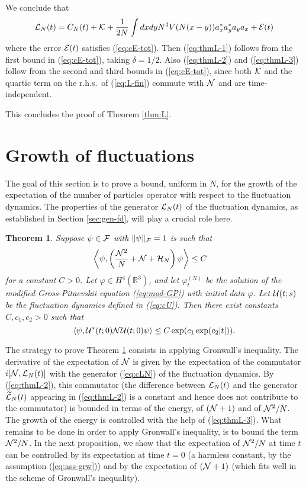 \documentclass[11pt,a4paper]{article}
\newtheorem{thm}{Theorem}[section]  %
\newcommand{\cU}{{\cal U}}
\newcommand{\bR}{{\mathbb R}}
\newcommand{\wt}{\widetilde}
\newcommand{\cF}{{\cal F}}
\newcommand{\cE}{{\cal E}}
\newcommand{\cK}{{\cal K}}
\newcommand{\cH}{{\cal H}}
\newcommand{\cL}{{\cal L}}
\newcommand{\cN}{{\cal N}}
\begin{document}
We conclude that
\begin{equation}\label{eq:L-fin} \cL_N (t) = C_N (t) + \cK  + \frac{1}{2N}  \int dx dy N^3 V (N (x-y)) a_x^* a_y^* a_y a_x + \cE (t) \end{equation}
where the error $\cE (t)$ satisfies (\ref{eq:cE-tot}). Then (\ref{eq:thmL-1}) follows from the first bound in (\ref{eq:cE-tot}), taking $\delta = 1/2$. Also (\ref{eq:thmL-2}) and (\ref{eq:thmL-3}) follow from the second and third bounds in (\ref{eq:cE-tot}), since both $\cK$ and the quartic term on the r.h.s.\ of (\ref{eq:L-fin}) commute with $\cN$ and are time-independent. 

This concludes the proof of Theorem \ref{thm:L}.

\section{Growth of fluctuations}
\label{s:growthoffluct}
The goal of this section is to prove a bound, uniform in $N$, for the growth of the expectation of the number of particles operator with respect to the fluctuation dynamics. The properties of the generator $\cL_N (t)$ of the fluctuation dynamics, as established in Section \ref{sec:gen-fd}, will play a crucial role here.

\begin{thm}\label{thm:N}
Suppose $\psi \in \cF$ with $\| \psi \|_\cF  =1$ is such that \begin{equation}\label{eq:ass-grw} \begin{split} \left\langle \psi , \left( \frac{\cN^2}{N} + \cN + \cH_N \right) \psi \right\rangle &\leq C  \end{split} \end{equation}
for a constant $C>0$. Let $\varphi \in H^4 (\bR^3)$, and let $\varphi_t^{(N)}$ be the solution of the modified Gross-Pitaevskii equation (\ref{eq:mod-GP}) with initial data $\varphi$. Let $\cU (t;s)$ be the fluctuation dynamics defined in (\ref{eq:cU}). Then there exist constants $C,c_1,c_2 > 0$ such that
\[ \langle \psi , \cU^* (t;0) \cN \cU (t;0) \psi \rangle \leq C \exp (c_1 \exp (c_2 |t|)). \] 
\end{thm}

The strategy to prove Theorem \ref{thm:N} consists in applying Gronwall's inequality. The derivative of the expectation of $\cN$ is given by the expectation of the commutator $i[\cN , \cL_N (t)]$ with the generator (\ref{eq:cLN}) of the fluctuation dynamics. By (\ref{eq:thmL-2}), this commutator (the difference between $\cL_N (t)$ and the generator $\wt{\cL}_N (t)$ appearing in (\ref{eq:thmL-2}) is a constant and hence does not contribute to the commutator) is bounded in terms of the energy, of $(\cN+ 1)$ and of $\cN^2/N$. The growth of the energy is controlled with the help of (\ref{eq:thmL-3}). What remains to be done in order to apply Gronwall's inequality, is to bound the term $\cN^2 / N$. In the next proposition, we show that the expectation of $\cN^2/N$ at time $t$ can be controlled by its expectation at time $t=0$ (a harmless constant, by the assumption (\ref{eq:ass-grw})) and by the expectation of $(\cN+1)$ (which fits well in the scheme of Gronwall's inequality). 
\end{document}
